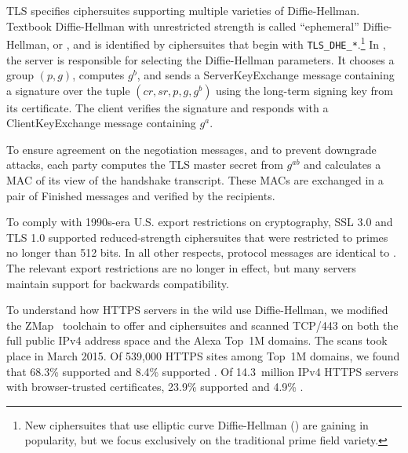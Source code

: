 TLS specifies ciphersuites supporting multiple varieties of
Diffie-Hellman.
 Textbook Diffie-Hellman with unrestricted strength is
 called ``ephemeral''  Diffie-Hellman, or \dhe{},
 and is identified by ciphersuites that begin with
\texttt{TLS\_DHE\_*}.\footnote{\small New ciphersuites that use elliptic curve Diffie-Hellman (\ecdhe{})
  are gaining in popularity, but we focus exclusively on the traditional
  prime field variety.}
 In \dhe{}, the server is responsible for selecting the Diffie-Hellman parameters.
 It chooses a group $(p,g)$, computes $g^b$, and
 sends a \textsf{ServerKeyExchange} message containing a signature over
 the tuple $(cr, sr, p, g, g^b)$ using the long-term signing key from its certificate.
 The client verifies the signature and responds with a \textsf{ClientKeyExchange}
 message containing $g^a$.

 To ensure agreement on the negotiation messages, and to prevent downgrade attacks,
 each party computes the TLS master secret from $g^{ab}$ and calculates a MAC of its view of the
 handshake transcript.  These MACs are exchanged in a pair of \textsf{Finished} messages and
 verified by the recipients.

To comply with 1990s-era U.S. export restrictions on
cryptography, SSL 3.0 and TLS 1.0 supported reduced-strength
\dheexp{} ciphersuites that were restricted to
primes no longer than 512 bits. In all other
respects, \dheexp{} protocol messages are identical to \dhe{}.
The relevant export restrictions are no longer in effect, but many
servers maintain support for backwards compatibility.

To understand how HTTPS servers in the wild use Diffie-Hellman, we
modified the ZMap~\cite{ZMap} toolchain to offer \dhe{} and \dheexp{}
ciphersuites and scanned TCP/443 on both the full public IPv4 address
space and the Alexa Top~1M domains.  The scans took place in
March 2015.  Of 539,000 HTTPS sites among Top~1M domains, we found
that 68.3\% supported \dhe{} and 8.4\% supported \dheexp{}.  Of
14.3~million IPv4 HTTPS servers with browser-trusted certificates, 23.9\%
supported \dhe{} and 4.9\% \dheexp{}.

